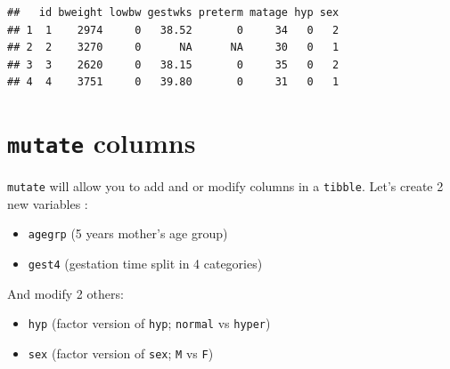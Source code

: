 \documentclass[
]{book}
\providecommand{\tightlist}{%
  \setlength{\itemsep}{0pt}\setlength{\parskip}{0pt}}
\begin{document}
\begin{verbatim}
##   id bweight lowbw gestwks preterm matage hyp sex
## 1  1    2974     0   38.52       0     34   0   2
## 2  2    3270     0      NA      NA     30   0   1
## 3  3    2620     0   38.15       0     35   0   2
## 4  4    3751     0   39.80       0     31   0   1
\end{verbatim}

\section{\texorpdfstring{\texttt{mutate} columns}{mutate columns}}\label{mutate-columns}

\texttt{mutate} will allow you to add and or modify columns in a \texttt{tibble}.
Let's create 2 new variables :

\begin{itemize}
\tightlist
\item
  \texttt{agegrp} (5 years mother's age group)
\item
  \texttt{gest4} (gestation time split in 4 categories)
\end{itemize}

And modify 2 others:

\begin{itemize}
\tightlist
\item
  \texttt{hyp} (factor version of \texttt{hyp}; \texttt{normal} vs \texttt{hyper})
\item
  \texttt{sex} (factor version of \texttt{sex}; \texttt{M} vs \texttt{F})
\end{itemize}
\end{document}
